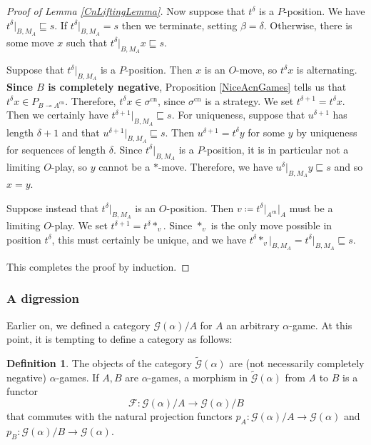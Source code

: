 \documentclass[11pt]{article} %
\theoremstyle{plain} %
\theoremstyle{definition} %
\newtheorem{definition}[theorem]{Definition}
\theoremstyle{note}
\theoremstyle{exercisestyle}
\newcommand*\from{\colon}
\renewcommand{\implies}{\multimap}
\newcommand{\G}{\mathcal G}
\newcommand{\F}{\mathcal F}
\newcommand{\prefix}{\sqsubseteq}
\DeclareMathOperator{\cn}{cn}
\begin{document}
\begin{proof}[Proof of Lemma \ref{CnLiftingLemma}]
  Now suppose that $t^\delta$ is a $P$-position.  We have $t^\delta\vert_{B,M_A}\prefix s$.  If $t^\delta\vert_{B,M_A}=s$ then we terminate, setting $\beta=\delta$.  Otherwise, there is some move $x$ such that $t^\delta\vert_{B,M_A}x\prefix s$.  

  Suppose that $t^\delta\vert_{B,M_A}$ is a $P$-position.  Then $x$ is an $O$-move, so $t^\delta x$ is alternating.  \textbf{Since $B$ is completely negative}, Proposition \ref{NiceAcnGames} tells us that $t^\delta x\in P_{B\implies A^{\cn}}$.  Therefore, $t^\delta x\in\sigma^{\cn}$, since $\sigma^{\cn}$ is a strategy.  We set $t^{\delta+1}=t^\delta x$.  Then we certainly have $t^{\delta+1}\vert_{B,M_A}\prefix s$.  For uniqueness, suppose that $u^{\delta+1}$ has length $\delta+1$ and that $u^{\delta+1}\vert_{B,M_A}\prefix s$.  Then $u^{\delta+1}=t^\delta y$ for some $y$ by uniqueness for sequences of length $\delta$.  Since $t^\delta\vert_{B,M_A}$ is a $P$-position, it is in particular not a limiting $O$-play, so $y$ cannot be a $*$-move.  Therefore, we have $u^{\delta}\vert_{B,M_A}y\prefix s$ and so $x=y$.  

  Suppose instead that $t^\delta\vert_{B,M_A}$ is an $O$-position.  Then $v\coloneqq t^\delta\vert_{A^{\cn}}\vert_A$ must be a limiting $O$-play.  We set $t^{\delta+1}=t^\delta *_v$.  Since $*_v$ is the only move possible in position $t^\delta$, this must certainly be unique, and we have $t^\delta *_v\vert_{B,M_A}=t^\delta\vert_{B,M_A}\prefix s$.  

  This completes the proof by induction.
\end{proof}

\subsubsection{A digression}
\label{DigressionSex}

Earlier on, we defined a category $\G(\alpha)/A$ for $A$ an arbitrary $\alpha$-game.  At this point, it is tempting to define a category as follows:

\begin{definition}
  The objects of the category $\tilde{\G}(\alpha)$ are (not necessarily completely negative) $\alpha$-games.  If $A,B$ are $\alpha$-games, a morphism in $\tilde{\G}(\alpha)$ from $A$ to $B$ is a functor
  \[
    \F\from\G(\alpha)/A\to\G(\alpha)/B
    \]
  that commutes with the natural projection functors $p_A\from\G(\alpha)/A\to\G(\alpha)$ and $p_B\from\G(\alpha)/B\to\G(\alpha)$.  
\end{definition}
\end{document}
